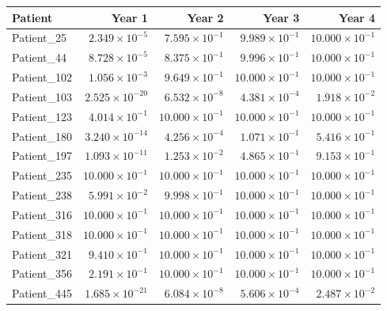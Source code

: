 \begin{center}\small\begin{tabular}{lrrrr}\toprule Patient & Year 1 & Year 2 & Year 3 & Year 4\\\midrule

Patient\_25 & $2.349\times10^{-5}$ & $7.595\times10^{-1}$ & $9.989\times10^{-1}$ & $10.000\times10^{-1}$\\

Patient\_44 & $8.728\times10^{-5}$ & $8.375\times10^{-1}$ & $9.996\times10^{-1}$ & $10.000\times10^{-1}$\\

Patient\_102 & $1.056\times10^{-3}$ & $9.649\times10^{-1}$ & $10.000\times10^{-1}$ & $10.000\times10^{-1}$\\

Patient\_103 & $2.525\times10^{-20}$ & $6.532\times10^{-8}$ & $4.381\times10^{-4}$ & $1.918\times10^{-2}$\\

Patient\_123 & $4.014\times10^{-1}$ & $10.000\times10^{-1}$ & $10.000\times10^{-1}$ & $10.000\times10^{-1}$\\

Patient\_180 & $3.240\times10^{-14}$ & $4.256\times10^{-4}$ & $1.071\times10^{-1}$ & $5.416\times10^{-1}$\\

Patient\_197 & $1.093\times10^{-11}$ & $1.253\times10^{-2}$ & $4.865\times10^{-1}$ & $9.153\times10^{-1}$\\

Patient\_235 & $10.000\times10^{-1}$ & $10.000\times10^{-1}$ & $10.000\times10^{-1}$ & $10.000\times10^{-1}$\\

Patient\_238 & $5.991\times10^{-2}$ & $9.998\times10^{-1}$ & $10.000\times10^{-1}$ & $10.000\times10^{-1}$\\

Patient\_316 & $10.000\times10^{-1}$ & $10.000\times10^{-1}$ & $10.000\times10^{-1}$ & $10.000\times10^{-1}$\\

Patient\_318 & $10.000\times10^{-1}$ & $10.000\times10^{-1}$ & $10.000\times10^{-1}$ & $10.000\times10^{-1}$\\

Patient\_321 & $9.410\times10^{-1}$ & $10.000\times10^{-1}$ & $10.000\times10^{-1}$ & $10.000\times10^{-1}$\\

Patient\_356 & $2.191\times10^{-1}$ & $10.000\times10^{-1}$ & $10.000\times10^{-1}$ & $10.000\times10^{-1}$\\

Patient\_445 & $1.685\times10^{-21}$ & $6.084\times10^{-8}$ & $5.606\times10^{-4}$ & $2.487\times10^{-2}$\\

\bottomrule\end{tabular}\end{center}

